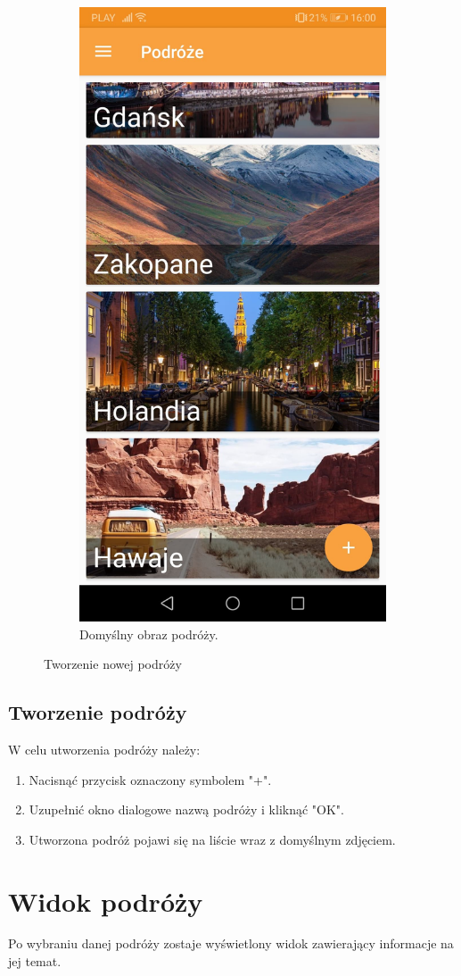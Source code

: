 \documentclass[10pt,twoside,a4paper]{report}
\begin{document}
\begin{figure}[h]
\begin{subfigure}{0.3\textwidth}
\centering
\includegraphics[width=0.8\linewidth, width=4.5cm]{defaultImage}
\caption{Domyślny obraz podróży.}
\label{fig:defaultImage}
\end{subfigure}
\caption{Tworzenie nowej podróży}
\label{fig:podrecznik3}
\end{figure}
\FloatBarrier

\subsection{Tworzenie podróży}
W celu utworzenia podróży należy:
\begin{enumerate}
\item Nacisnąć przycisk oznaczony symbolem "+".
\item Uzupełnić okno dialogowe nazwą podróży i kliknąć "OK".
\item Utworzona podróż pojawi się na liście wraz z domyślnym zdjęciem.
\end{enumerate}


\section{Widok podróży}
Po wybraniu danej podróży zostaje wyświetlony widok zawierający informacje na jej temat.
\end{document}
